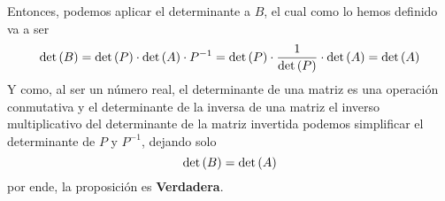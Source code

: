 \begin{enumerate}[label=\listAlph]
\[            \]
            Entonces, podemos aplicar el determinante a \(B\), el cual como lo hemos definido va a ser
            \[
                \text{det} \left( B \right) = \text{det} \left( P \right) \cdot \text{det} \left( A \right) \cdot{P^{-1}} = \text{det} \left( P \right) \cdot \frac{1}{\text{det} \left( P \right)} \cdot \text{det} \left( A \right) = \text{det} \left( A \right)
            \]
            Y como, al ser un número real, el determinante de una matriz es una operación conmutativa y el determinante de la inversa de una matriz 
            el inverso multiplicativo del determinante de la matriz invertida podemos simplificar el determinante de \(P\) y \(P^{-1}\), dejando solo 
            \[
                \text{det} \left( B \right) = \text{det} \left( A \right)
            \]
            por ende, la proposición es \textbf{Verdadera}.
    \end{enumerate}

